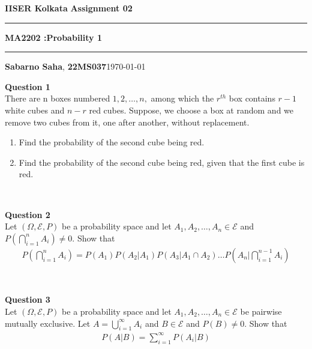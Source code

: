 \documentclass[addpoints]{exam}
\begin{document}
\par\textbf{IISER Kolkata} \hfill \textbf{Assignment 02}
\vspace{3pt}
\hrule
\vspace{3pt}
\begin{center}
        \LARGE{\textbf{MA2202 :Probability 1}}
\end{center}
\vspace{3pt}

\hrule
\vspace{4pt}
\textbf{Sabarno Saha}, \textbf{22MS037}\hfill \today

\vspace{20pt}

\bigskip

\begin{questions}
    \questionlabel \textbf{ Question 1}\\

There are n boxes numbered \(1, 2, \dots , n,\) among which the \(r^{th}\) box contains \(r - 1\) white cubes
and \(n - r\) red cubes. Suppose, we choose a box at random and we remove two cubes from it,
one after another, without replacement.
\begin{enumerate}[label = (\alph*)]
    \item  Find the probability of the second cube being red.
    \item  Find the probability of the second cube being red, given that the first cube is red.
\end{enumerate}


\begin{solution}\\
 
\end{solution}

\question \textbf{ Question 2}\\
Let \((\Omega,\mathcal{E},P)\) be a probability space and let \(A_1,A_2,\dots,A_n \in \mathcal{E}\)
and \(P(\bigcap_{i=1}^{n}A_i)\neq 0\). Show that 
\begin{align*}
   P(\bigcap_{i=1}^{n}A_i) = P(A_1)P(A_2|A_1)P(A_3|A_1\cap A_2)\dots P(A_n|\bigcap_{i=1}^{n-1}A_i)
\end{align*}

\begin{solution}\\
 
\end{solution}

\question \textbf{ Question 3}\\
Let \((\Omega,\mathcal{E},P)\) be a probability space and let \(A_1,A_2,\dots,A_n \in \mathcal{E}\)
be pairwise mutually exclusive. Let \(A = \bigcup_{i=1}^{\infty}A_i\) and \(B \in \mathcal{E}\)
and \(P(B)\neq 0 \). Show that
\begin{align}
    P(A|B) = \sum_{i=1}^{\infty}P(A_i|B)
\end{align}


\end{questions}
\end{document}

